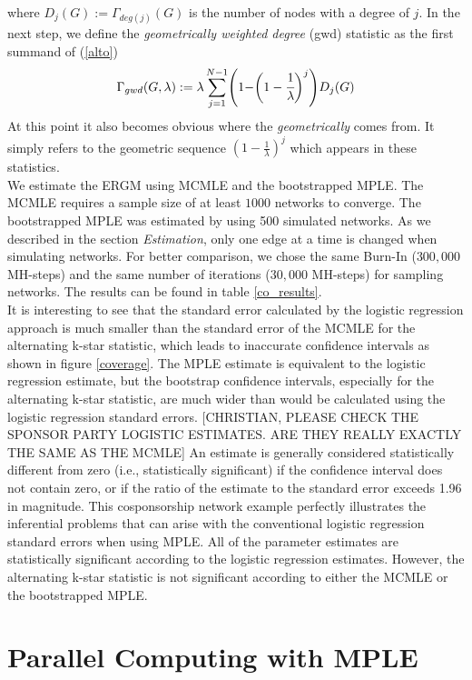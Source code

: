 \documentclass[10pt, conference, compsocconf]{IEEEtran}
\begin{document}
where $D_j(G):= \Gamma_{deg(j)}(G)$ is the number of nodes with a degree of $j$. 
In the next step, we define the \textit{geometrically weighted degree} (gwd) statistic as the first summand of (\ref{alto})
\begin{equation}
\Gamma_{gwd}(G,\lambda):= \lambda\sum_{j=1}^{N-1}\Biggr(1- \biggr(1-\cfrac{1}{\lambda}\biggl)^j\Biggl)D_j(G)
\end{equation}
At this point it also becomes obvious where the \textit{geometrically} comes from. It simply refers to the geometric sequence $(1-\frac{1}{\lambda})^j$ which appears in these statistics.\\[0.3cm]

We estimate the ERGM using MCMLE and the bootstrapped MPLE. The MCMLE requires a sample size of at least $1000$ networks to converge. The bootstrapped MPLE was estimated by using 500 simulated networks. As we described in the section {\it Estimation}, only one edge at a time is changed when simulating networks. For better comparison, we chose the same Burn-In ($300,000$ MH-steps) and the same number of iterations ($30,000$ MH-steps) for sampling networks. The results can be found in table \ref{co_results}.\\
It is interesting to see that the standard error calculated by the logistic regression approach is much smaller than the standard error of the MCMLE for the alternating k-star statistic, which leads to inaccurate confidence intervals as shown in figure \ref{coverage}. The MPLE estimate is equivalent to the logistic regression estimate, but the bootstrap confidence intervals, especially for the alternating k-star statistic, are much wider than would be calculated using the logistic regression standard errors. [CHRISTIAN, PLEASE CHECK THE SPONSOR PARTY LOGISTIC ESTIMATES. ARE THEY REALLY EXACTLY THE SAME AS THE MCMLE]  An estimate is generally considered statistically different from zero (i.e., statistically significant) if the confidence interval does not contain zero, or if the ratio of the estimate to the standard error exceeds 1.96 in magnitude. This cosponsorship network example perfectly illustrates the inferential problems that can arise with the conventional logistic regression standard errors when using MPLE. All of the parameter estimates are statistically significant according to the logistic regression estimates. However, the alternating k-star statistic is not significant according to either the MCMLE or the bootstrapped MPLE.

\section{Parallel Computing with MPLE}
\end{document}
